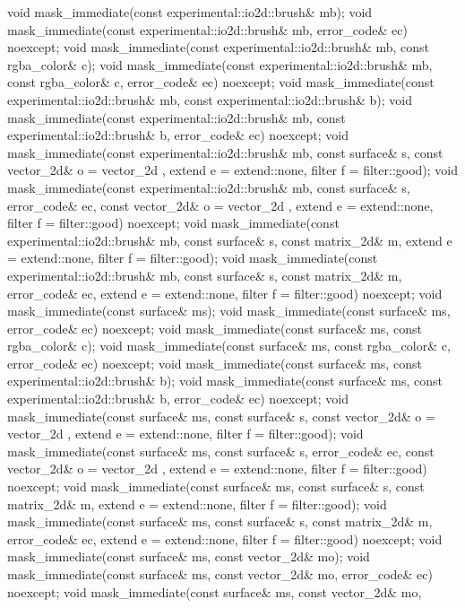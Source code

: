 \begin{itemdecl}
void mask_immediate(const experimental::io2d::brush& mb);
void mask_immediate(const experimental::io2d::brush& mb, error_code& ec)
  noexcept;
void mask_immediate(const experimental::io2d::brush& mb,
  const rgba_color& c);
void mask_immediate(const experimental::io2d::brush& mb,
  const rgba_color& c, error_code& ec) noexcept;
void mask_immediate(const experimental::io2d::brush& mb,
  const experimental::io2d::brush& b);
void mask_immediate(const experimental::io2d::brush& mb,
  const experimental::io2d::brush& b, error_code& ec) noexcept;
void mask_immediate(const experimental::io2d::brush& mb, const surface& s,
  const vector_2d& o = vector_2d{ }, extend e = extend::none,
  filter f = filter::good);
void mask_immediate(const experimental::io2d::brush& mb, const surface& s,
  error_code& ec, const vector_2d& o = vector_2d{ },
  extend e = extend::none, filter f = filter::good) noexcept;
void mask_immediate(const experimental::io2d::brush& mb, const surface& s, 
  const matrix_2d& m, extend e = extend::none, filter f = filter::good);
void mask_immediate(const experimental::io2d::brush& mb, const surface& s,
  const matrix_2d& m, error_code& ec, extend e = extend::none,
  filter f = filter::good) noexcept;
void mask_immediate(const surface& ms);
void mask_immediate(const surface& ms, error_code& ec) noexcept;
void mask_immediate(const surface& ms, const rgba_color& c);
void mask_immediate(const surface& ms, const rgba_color& c, error_code& ec) 
  noexcept;
void mask_immediate(const surface& ms, const experimental::io2d::brush& b);
void mask_immediate(const surface& ms, const experimental::io2d::brush& b,
  error_code& ec) noexcept;
void mask_immediate(const surface& ms, const surface& s,
  const vector_2d& o = vector_2d{ }, extend e = extend::none,
  filter f = filter::good);
void mask_immediate(const surface& ms, const surface& s, error_code& ec,
  const vector_2d& o = vector_2d{ }, extend e = extend::none,
  filter f = filter::good) noexcept;
void mask_immediate(const surface& ms, const surface& s, const matrix_2d& m,
  extend e = extend::none, filter f = filter::good);
void mask_immediate(const surface& ms, const surface& s,
  const matrix_2d& m, error_code& ec, extend e = extend::none,
  filter f = filter::good) noexcept;
void mask_immediate(const surface& ms, const vector_2d& mo);
void mask_immediate(const surface& ms, const vector_2d& mo, error_code& ec)
  noexcept;
void mask_immediate(const surface& ms, const vector_2d& mo,

\end{itemdecl}

